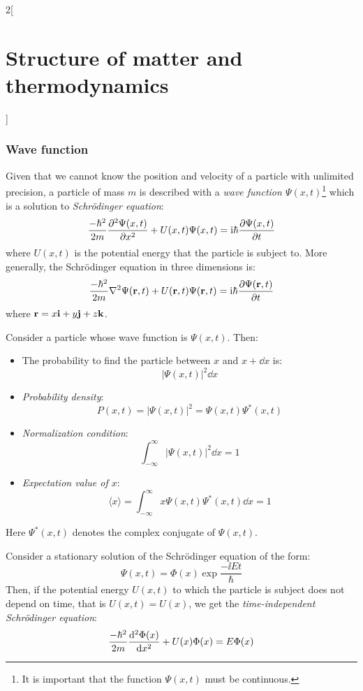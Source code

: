 \documentclass[../../../main.tex]{subfiles}
\begin{document}
\begin{multicols}{2}[\section{Structure of matter and thermodynamics}]
    \subsubsection{Wave function}
    \begin{definition}
        Given that we cannot know the position and velocity of a particle with unlimited precision, a particle of mass $m$ is described with a \textit{wave function $\Psi(x,t)$}\footnote{It is important that the function $\Psi(x,t)$ must be continuous.} which is a solution to \textit{Schrödinger equation}:
        $$\frac{-\hbar^2}{2m}\pdv[2]{\Psi(x,t)}{x}+U(x,t)\Psi(x,t)=\mathrm{i}\hbar\pdv{\Psi(x,t)}{t}$$
        where $U(x,t)$ is the potential energy that the particle is subject to. More generally, the Schrödinger equation in three dimensions is:
        $$\frac{-\hbar^2}{2m}\laplacian\Psi(\vf{r},t)+U(\vf{r},t)\Psi(\vf{r},t)=\ii\hbar\pdv{\Psi(\vf{r},t)}{t}$$ where $\boldsymbol{\mathrm{r}}=x\boldsymbol{\mathrm{i}}+y\boldsymbol{\mathrm{j}}+z\boldsymbol{\mathrm{k}}$.
    \end{definition}
    \begin{prop}
        Consider a particle whose wave function is $\Psi(x,t)$. Then:
        \begin{itemize}
            \item The probability to find the particle between $x$ and $x+\dd x$ is: $$|\Psi(x,t)|^2\dd x$$
            \item \textit{Probability density}: $$P(x,t)=|\Psi(x,t)|^2=\Psi(x,t)\Psi^*(x,t)$$
            \item \textit{Normalization condition}: $$\int_{-\infty}^\infty|\Psi(x,t)|^2\dd x=1$$
            \item \textit{Expectation value of $x$}: $$\langle x\rangle=\int_{-\infty}^\infty x\Psi(x,t)\Psi^*(x,t)\dd x=1$$
        \end{itemize}
        Here $\Psi^*(x,t)$ denotes the complex conjugate of $\Psi(x,t)$.
    \end{prop}
    \begin{definition}
        Consider a stationary solution of the Schrö\-din\-ger equation of the form: $$\Psi(x,t)=\Phi(x)\exp{\frac{-\ii Et}{\hbar}}$$
        Then, if the potential energy $U(x,t)$ to which the particle is subject does not depend on time, that is $U(x,t)=U(x)$, we get the \textit{time-independent Schrödinger equation}:
        \begin{equation}\label{SMT_schrodinger}
            \frac{-\hbar^2}{2m}\dv[2]{\Phi(x)}{x}+U(x)\Phi(x)=E\Phi(x)

\end{equation}
\end{definition}
\end{multicols}
\end{document}
